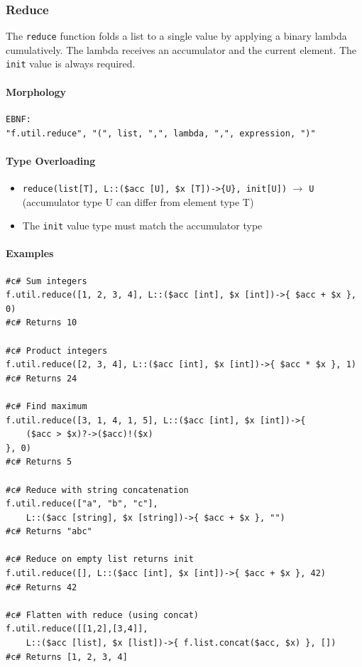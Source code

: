 \subsubsection{Reduce}
The \texttt{reduce} function folds a list to a single value by applying a binary lambda cumulatively. The lambda receives an accumulator and the current element. The \texttt{init} value is always required.

\paragraph{Morphology}
\begin{verbatim}
EBNF:
"f.util.reduce", "(", list, ",", lambda, ",", expression, ")"
\end{verbatim}

\paragraph{Type Overloading}
\begin{itemize}
\item \texttt{reduce(list[T], L::(\$acc [U], \$x [T])->\{U\}, init[U])} $\rightarrow$ \texttt{U}
  (accumulator type U can differ from element type T)
\item The \texttt{init} value type must match the accumulator type
\end{itemize}

\paragraph{Examples}
\begin{verbatim}
#c# Sum integers
f.util.reduce([1, 2, 3, 4], L::($acc [int], $x [int])->{ $acc + $x }, 0)
#c# Returns 10

#c# Product integers
f.util.reduce([2, 3, 4], L::($acc [int], $x [int])->{ $acc * $x }, 1)
#c# Returns 24

#c# Find maximum
f.util.reduce([3, 1, 4, 1, 5], L::($acc [int], $x [int])->{ 
    ($acc > $x)?->($acc)!($x) 
}, 0)
#c# Returns 5

#c# Reduce with string concatenation
f.util.reduce(["a", "b", "c"],
    L::($acc [string], $x [string])->{ $acc + $x }, "")
#c# Returns "abc"

#c# Reduce on empty list returns init
f.util.reduce([], L::($acc [int], $x [int])->{ $acc + $x }, 42)
#c# Returns 42

#c# Flatten with reduce (using concat)
f.util.reduce([[1,2],[3,4]],
    L::($acc [list], $x [list])->{ f.list.concat($acc, $x) }, [])
#c# Returns [1, 2, 3, 4]
\end{verbatim}

